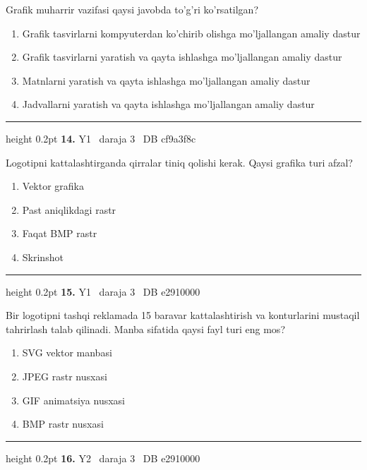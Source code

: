 \documentclass[10pt,a4paper,oneside]{article}
\begin{document}
Grafik muharrir vazifasi qaysi javobda to'g'ri ko'rsatilgan?
\begin{enumerate}[label=\Alph*),leftmargin=9mm]
\item Grafik tasvirlarni kompyuterdan ko'chirib olishga mo'ljallangan amaliy dastur
\item Grafik tasvirlarni yaratish va qayta ishlashga mo'ljallangan amaliy dastur
\item Matnlarni yaratish va qayta ishlashga mo'ljallangan amaliy dastur
\item Jadvallarni yaratish va qayta ishlashga mo'ljallangan amaliy dastur
\end{enumerate}
\vspace{2mm}\hrule height 0.2pt \vspace{4mm}
\hypertarget{q14}{\textbf{\color{ink}14.}}  {\color{muted}\scriptsize Y1 \textbullet\ daraja 3 \textbullet\ DB cf9a3f8c}
\par
Logotipni kattalashtirganda qirralar tiniq qolishi kerak. Qaysi grafika turi afzal?
\begin{enumerate}[label=\Alph*),leftmargin=9mm]
\item Vektor grafika
\item Past aniqlikdagi rastr
\item Faqat BMP rastr
\item Skrinshot
\end{enumerate}
\vspace{2mm}\hrule height 0.2pt \vspace{4mm}
\hypertarget{q15}{\textbf{\color{ink}15.}}  {\color{muted}\scriptsize Y1 \textbullet\ daraja 3 \textbullet\ DB e2910000}
\par
Bir logotipni tashqi reklamada 15 baravar kattalashtirish va konturlarini mustaqil tahrirlash talab qilinadi. Manba sifatida qaysi fayl turi eng mos?
\begin{enumerate}[label=\Alph*),leftmargin=9mm]
\item SVG vektor manbasi
\item JPEG rastr nusxasi
\item GIF animatsiya nusxasi
\item BMP rastr nusxasi
\end{enumerate}
\vspace{2mm}\hrule height 0.2pt \vspace{4mm}
\hypertarget{q16}{\textbf{\color{ink}16.}}  {\color{muted}\scriptsize Y2 \textbullet\ daraja 3 \textbullet\ DB e2910000}
\end{document}
